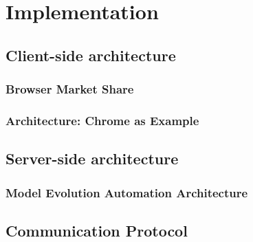 \section{Implementation}

\subsection{Client-side architecture}

\subsubsection{Browser Market Share}

\subsubsection{Architecture: Chrome as Example}

\subsection{Server-side architecture}


\subsubsection{Model Evolution Automation Architecture}

\subsection{Communication Protocol}

\cleardoublepage